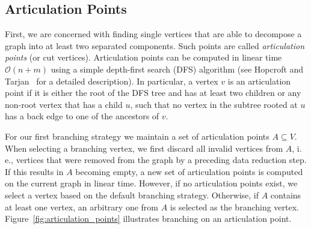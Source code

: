 \documentclass[a4paper,UKenglish,cleveref, autoref, thm-restate]{lipics-v2021}
\newcommand{\ie}{i.\,e.,\xspace}
\begin{document}
\subsection{Articulation Points}
First, we are concerned with finding single vertices that are able to decompose a graph into at least two separated components.
Such points are called \emph{articulation points} (or cut vertices).
Articulation points can be computed in linear time $\mathcal{O}(n+m)$ using a simple depth-first search (DFS) algorithm (see Hopcroft and Tarjan~\cite{hopcroft1973algorithm} for a detailed description).
In particular, a vertex $v$ is an articulation point if it is either the root of
the DFS tree and has at least two children or any non-root vertex that has a child $u$, such that no vertex in
the subtree rooted at $u$ has a back edge to one of the ancestors of
$v$. 

For our first branching strategy we maintain a set of articulation points $A \subseteq V$.
When selecting a branching vertex, we first discard all invalid vertices from
$A$, \ie vertices that were removed from the graph by a preceding data reduction step.
If this results in $A$ becoming empty, a new set of articulation points is computed on the current graph in linear time.
However, if no articulation points exist, we select a vertex based on the default branching strategy.
Otherwise, if $A$ contains at least one vertex, an arbitrary one from $A$ is selected as the branching
vertex. Figure~\ref{fig:articulation_points} illustrates branching on an
articulation point.
\end{document}
